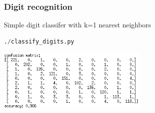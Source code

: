 \begin{frame}[fragile]
  \frametitle{Digit recognition}

  \begin{center}
    \begin{block}{Simple digit classifer with k=1 nearest neighbors}
        \begin{lstlisting}[language=python]
 ./classify_digits.py
        \end{lstlisting}
    \end{block}
    \vskip20pt
    \includegraphics[width=0.55\textwidth]{digits_confmat.png}
  \end{center}
\end{frame}
